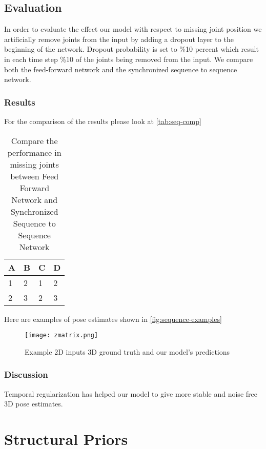 \subsection{Evaluation}

In order to evaluate the effect our model with respect to missing joint position we artificially remove joints from the input by adding a dropout layer to the beginning of the network. Dropout probability is set to \%10 percent which result in each time step \%10 of the joints being removed from the input. We compare both the feed-forward network and the synchronized sequence to sequence network.

\subsubsection{Results}

For the comparison of the results please look at \autoref{tab:seq-comp}

\begin{table}[htpb]
    \centering
    \begin{tabular}{l l l l}
        \toprule
            A & B & C & D \\
        \midrule
            1 & 2 & 1 & 2 \\
            2 & 3 & 2 & 3 \\
        \bottomrule
    \end{tabular}
    \caption[Comparison Synchronized Sequence to Sequence Network]{Compare the performance in missing joints between Feed Forward Network and Synchronized Sequence to Sequence Network}\label{tab:seq-comp}
\end{table}


Here are examples of pose estimates shown in \autoref{fig:sequence-examples}

\begin{figure}[htpb]
    \texttt{[image: zmatrix.png]}
    \caption{Example 2D inputs 3D ground truth and our model's predictions}
    \label{fig:sequence-examples}
\end{figure}

\subsubsection{Discussion}

Temporal regularization has helped our model to give more stable and noise free 3D pose estimates.


\section{Structural Priors}

